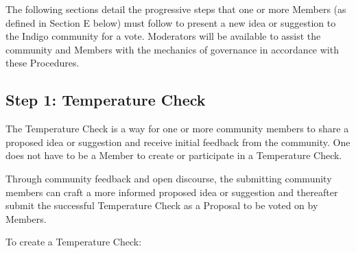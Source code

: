 The following sections detail the progressive steps that one or more
Members (as defined in Section E below) must follow to present a new
idea or suggestion to the Indigo community for a vote. Moderators will
be available to assist the community and Members with the mechanics of
governance in accordance with these Procedures.

\hypertarget{step-1-temperature-check}{%
\subsection{Step 1: Temperature Check}\label{step-1-temperature-check}}

The Temperature Check is a way for one or more community members to
share a proposed idea or suggestion and receive initial feedback from
the community. One does not have to be a Member to create or participate
in a Temperature Check.

Through community feedback and open discourse, the submitting community
members can craft a more informed proposed idea or suggestion and
thereafter submit the successful Temperature Check as a Proposal to be
voted on by Members.

To create a Temperature Check:

